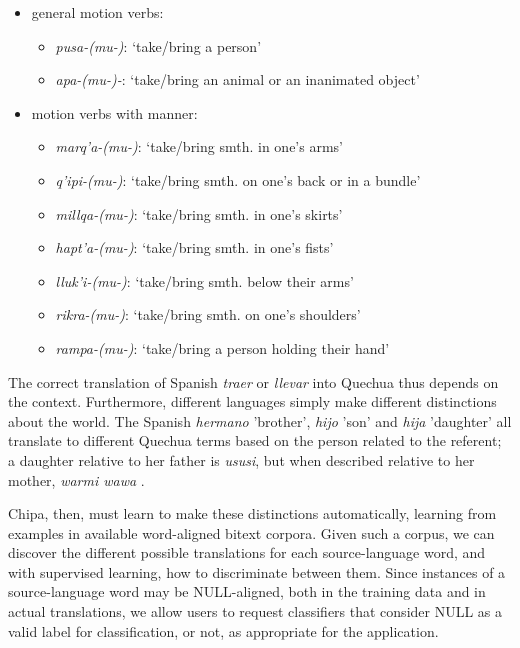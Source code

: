 \documentclass[10pt, a4paper]{article}
\begin{document}
\begin{itemize}
\renewcommand{\labelitemii}{$\bullet$}
 \small
 \item[] general motion verbs:
 \begin{itemize}
 \item {\em pusa-(mu-)}: `take/bring a person'
 \item {\em apa-(mu-)-}: `take/bring an animal or an inanimated object'
 \end{itemize}
 \item[] motion verbs with manner:
 \begin{itemize}
 \item {\em marq'a-(mu-)}: `take/bring smth. in one's arms'
 \item {\em q'ipi-(mu-)}:  `take/bring smth. on one's back or in a bundle'
 \item {\em millqa-(mu-)}: `take/bring smth. in one's skirts'
 \item {\em hapt'a-(mu-)}: `take/bring smth. in one's fists'
 \item {\em lluk'i-(mu-)}: `take/bring smth. below their arms'
 \item {\em rikra-(mu-)}:  `take/bring smth. on one's shoulders'
 \item {\em rampa-(mu-)}:  `take/bring a person holding their hand'
 \end{itemize}
\end{itemize}

The correct translation of Spanish {\em traer} or {\em llevar} into Quechua
thus depends on the context. Furthermore, different languages simply make
different distinctions about
the world. The Spanish \emph{hermano} 'brother', \emph{hijo} 'son' and
\emph{hija} 'daughter'
all translate to different
Quechua terms based on the person related to the referent; a daughter relative to
her father is \emph{ususi}, but when described relative to her mother,
\emph{warmi wawa} \cite{academiamayor}.

Chipa, then, must learn to make these distinctions automatically, learning from
examples in available word-aligned bitext corpora. Given such a corpus, we can
discover the different possible translations for each source-language word, and
with supervised learning, how to discriminate between them.  Since instances of
a source-language word may be NULL-aligned, both in the training data and in
actual translations, we allow users to request classifiers that consider NULL
as a valid label for classification, or not, as appropriate for the
application.
\end{document}
